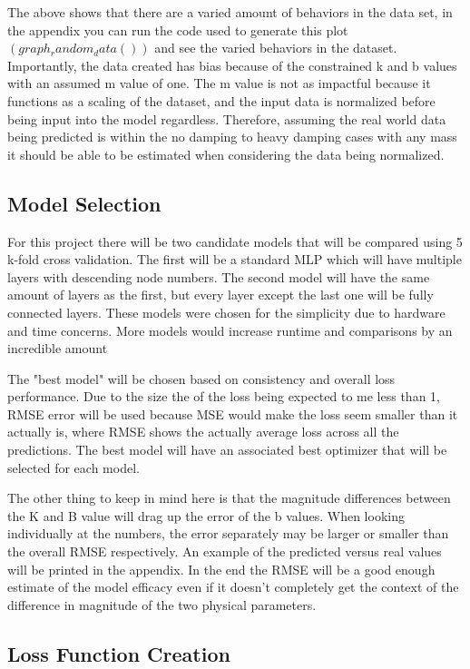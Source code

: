 \documentclass[12pt]{article}
\begin{document}
	The above shows that there are a varied amount of behaviors in the data set, in the appendix you can run the code used to generate this plot $(graph_random_data())$ and see the varied behaviors in the dataset. Importantly, the data created has bias because of the constrained k and b values with an assumed m value of one. The m value is not as impactful because it functions as a scaling of the dataset, and the input data is normalized before being input into the model regardless. Therefore, assuming the real world data being predicted is within the no damping to heavy damping cases with any mass it should be able to be estimated when considering the data being normalized.

	
	\subsection*{Model Selection}

	For this project there will be two candidate models that will be compared using 5 k-fold cross validation. The first will be a standard MLP which will have multiple layers with descending node numbers. The second model will have the same amount of layers as the first, but every layer except the last one will be fully connected layers. These models were chosen for the simplicity due to hardware and time concerns. More models would increase runtime and comparisons by an incredible amount

	The "best model" will be chosen based on consistency and overall loss performance. Due to the size the of the loss being expected to me less than 1, RMSE error will be used because MSE would make the loss seem smaller than it actually is, where RMSE shows the actually average loss across all the predictions. The best model will have an associated best optimizer that will be selected for each model.

	The other thing to keep in mind here is that the magnitude differences between the K and B value will drag up the error of the b values. When looking individually at the numbers, the error separately may be larger or smaller than the overall RMSE respectively. An example of the predicted versus real values will be printed in the appendix. In the end the RMSE will be a good enough estimate of the model efficacy even if it doesn't completely get the context of the difference in magnitude of the two physical parameters.

	\subsection*{Loss Function Creation}
\end{document}
